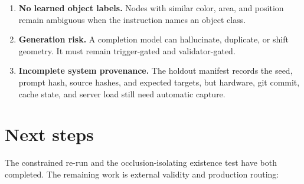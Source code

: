 \documentclass[10pt,a4paper]{article}
\begin{document}
\begin{enumerate}
  confuse containment with semantic identity.
  \item \textbf{No learned object labels.} Nodes with similar color, area, and
  position remain ambiguous when the instruction names an object class.
  \item \textbf{Generation risk.} A completion model can hallucinate,
  duplicate, or shift geometry. It must remain trigger-gated and
  validator-gated.
  \item \textbf{Incomplete system provenance.} The holdout manifest records the
  seed, prompt hash, source hashes, and expected targets, but hardware, git
  commit, cache state, and server load still need automatic capture.
\end{enumerate}

\section{Next steps}

The constrained re-run and the occlusion-isolating existence test have both
completed. The remaining work is external validity and production routing:
\end{document}
